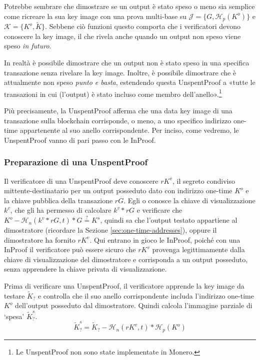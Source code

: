 Potrebbe sembrare che dimostrare se un output è stato speso o meno sia semplice come ricreare la sua key image con una prova multi-base su $\mathcal{J} = \{G,\mathcal{H}_p(K^o)\}$ e $\mathcal{K} = \{K^o,\tilde{K}\}$. Sebbene ciò funzioni questo comporta che i verificatori devono conoscere la key image, il che rivela anche quando un output non speso viene speso {\em in futuro}.

In realtà è possibile dimostrare che un output non è stato speso in una specifica transazione senza rivelare la key image. Inoltre, è possibile dimostrare che è attualmente non speso {\em punto e basta}, estendendo questa UnspentProof \cite{unspent-proof-issue-68} a «tutte le transazioni in cui (l'output) è stato incluso come membro dell’anello».\footnote{Le UnspentProof non sono state implementate in Monero.}

Più precisamente, la UnspentProof afferma che una data key image di una transazione sulla blockchain corrisponde, o meno, a uno specifico indirizzo one-time appartenente al suo anello corrispondente. Per inciso, come vedremo, le UnspentProof vanno di pari passo con le InProof.

\subsubsection*{Preparazione di una UnspentProof}

Il verificatore di una UnspentProof deve conoscere $r K^v$, il segreto condiviso mittente-destinatario per un output posseduto dato con indirizzo one-time $K^o$ e la chiave pubblica della transazione $r G$. Egli o conosce la chiave di visualizzazione $k^v$, che gli ha permesso di calcolare $k^v*r G$ e verificare che $K^o - \mathcal{H}_n(k^v*rG,t)*G \stackrel{?}{=} K^s$, quindi sa che l’output testato appartiene al dimostratore (ricordare la Sezione \ref{sec:one-time-addresses}), oppure il dimostratore ha fornito $r K^v$. Qui entrano in gioco le InProof, poiché con una InProof il verificatore può essere sicuro che $r K^v$ provenga legittimamente dalla chiave di visualizzazione del dimostratore e corrisponda a un output posseduto, senza apprendere la chiave privata di visualizzazione.

Prima di verificare una UnspentProof, il verificatore apprende la key image da testare $\tilde{K}_?$ e controlla che il suo anello corrispondente includa l’indirizzo one-time $K^o$ dell’output posseduto dal dimostratore. Quindi calcola l’immagine parziale di `spesa' $\tilde{K}^s_?$.\vspace{.175cm}
\[\tilde{K}^s_? = \tilde{K}_? - \mathcal{H}_n(r K^v,t)*\mathcal{H}_p(K^o)\]


